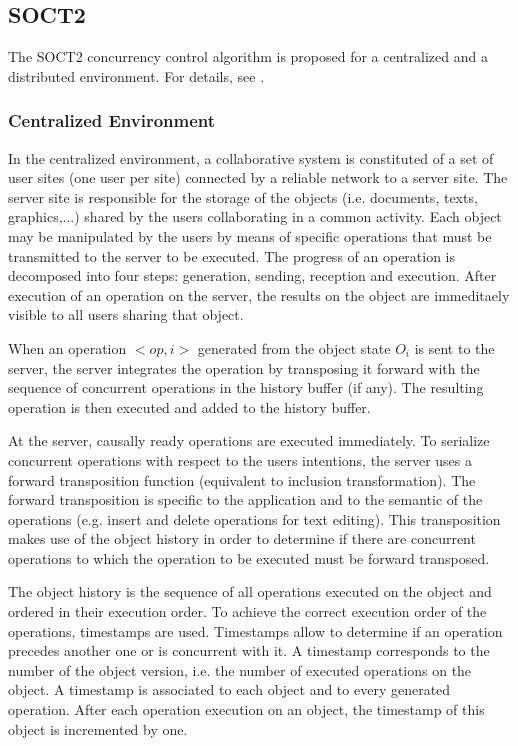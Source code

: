 \subsection{SOCT2}
\label{algo:soct2}

The SOCT2 concurrency control algorithm is proposed for a centralized and a distributed environment. For details, see \cite{suleiman97} \cite{suleiman98}.

\subsubsection{Centralized Environment}
In the centralized environment, a collaborative system is constituted of a set of user sites (one user per site) connected by a reliable network to a server site. The server site is responsible for the storage of the objects (i.e. documents, texts, graphics,...) shared by the users collaborating in a common activity. Each object may be manipulated by the users by means of specific operations that must be transmitted to the server to be executed. The progress of an operation is decomposed into four steps: generation, sending, reception and execution. After execution of an operation on the server, the results on the object are immeditaely visible to all users sharing that object.

When an operation $<op,i>$ generated from the object state $O_{i}$ is sent to the server, the server integrates the operation by transposing it forward with the sequence of concurrent operations in the history buffer (if any). The resulting operation is then executed and added to the history buffer.

At the server, causally ready operations are executed immediately. To serialize concurrent operations with respect to the users intentions, the server uses a forward transposition function (equivalent to inclusion transformation). The forward transposition is specific to the application and to the semantic of the operations (e.g. insert and delete operations for text editing). This transposition makes use of the object history in order to determine if there are concurrent operations to which the operation to be executed must be forward transposed.

The object history is the sequence of all operations executed on the object and ordered in their execution order. To achieve the correct execution order of the operations, timestamps are used. Timestamps allow to determine if an operation precedes another one or is concurrent with it. A timestamp corresponds to the number of the object version, i.e. the number of executed operations on the object. A timestamp is associated to each object and to every generated operation. After each operation execution on an object, the timestamp of this object is incremented by one.  


